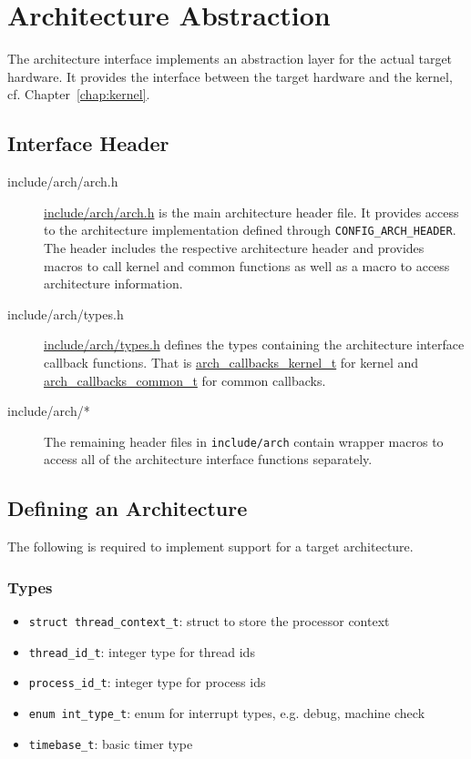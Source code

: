 \chapter{Architecture Abstraction\label{chap:arch}}
	The architecture interface implements an abstraction layer for the actual target hardware. It provides the interface between the target hardware and the kernel, cf. Chapter~\ref{chap:kernel}.


\section{Interface Header}
	\begin{description}
	\item[include/arch/arch.h]
		\hyperref[arch_8h]{include/arch/arch.h} is the main architecture header file. It provides access to the architecture implementation defined through \lstinline{CONFIG_ARCH_HEADER}. The header includes the respective architecture header and provides macros to call kernel and common functions as well as a macro to access architecture information.	
		

	\item[include/arch/types.h]
		\hyperref[arch_2types_8h]{include/arch/types.h} defines the types containing the architecture interface callback functions. That is \hyperref[structarch__callbacks__kernel__t]{arch\_callbacks\_kernel\_t} for kernel and \hyperref[structarch__callbacks__common__t]{arch\_callbacks\_common\_t} for common callbacks.

	\item[include/arch/*]
		The remaining header files in \lstinline{include/arch} contain wrapper macros to access all of the architecture interface functions separately.
	\end{description}


\section{Defining an Architecture}
	The following is required to implement support for a target architecture.

	\subsection{Types}
		\begin{itemize}
			\item \lstinline{struct thread_context_t}: struct to store the processor context
			\item \lstinline{thread_id_t}: integer type for thread ids
			\item \lstinline{process_id_t}: integer type for process ids
			\item \lstinline{enum int_type_t}: enum for interrupt types, e.g. debug, machine check
			\item \lstinline{timebase_t}: basic timer type
		\end{itemize}

